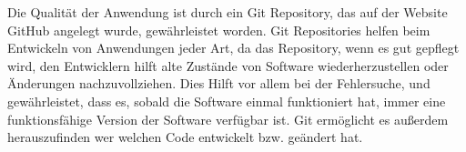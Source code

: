 Die Qualität der Anwendung ist durch ein Git Repository, das auf der Website GitHub angelegt wurde, gewährleistet worden. Git Repositories helfen beim Entwickeln von Anwendungen jeder Art, da das Repository, wenn es gut gepflegt wird, den Entwicklern hilft alte Zustände von Software wiederherzustellen oder Änderungen nachzuvollziehen. Dies Hilft vor allem bei der Fehlersuche, und gewährleistet, dass es, sobald die Software einmal funktioniert hat, immer eine funktionsfähige Version der Software verfügbar ist. \newline
Git ermöglicht es außerdem herauszufinden wer welchen Code entwickelt bzw. geändert hat.
